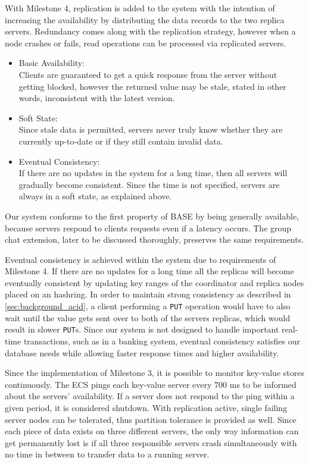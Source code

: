 With Milestone 4, replication is added to the system with the intention of increasing the availability by distributing the data records to the two replica servers. Redundancy comes along with the replication strategy, however when a node crashes or fails, read operations can be processed via replicated servers.

\begin{itemize}
  \item Basic Availability:\\
 Clients are guaranteed to get a quick response from the server without getting blocked, however the returned value may be stale, stated in other words, inconsistent with the latest version.
  \item Soft State:\\
Since stale data is permitted, servers never truly know whether they are currently up-to-date or if they still contain invalid data.
  \item Eventual Consistency:\\
If there are no updates in the system for a long time, then all servers will gradually become consistent. Since the time is not specified, servers are always in a soft state, as explained above.
\end{itemize}

Our system conforms to the first property of BASE by being generally available, because servers respond to clients requests even if a latency occurs. The group chat extension, later to be discussed thoroughly, preserves the same requirements.

Eventual consistency is achieved within the system due to requirements of Milestone 4. If there are no updates for a long time all the replicas will become eventually consistent by updating key ranges of the coordinator and replica nodes placed on an hashring. In order to maintain strong consistency as described in \ref{sec:background_acid}, a client performing a \texttt{PUT} operation would have to also wait until the value gets sent over to both of the servers replicas, which would result in slower \texttt{PUT}s. Since our system is not designed to handle important real-time transactions, such as in a banking system, eventual consistency satisfies our database needs while allowing faster response times and higher availability. 

Since the implementation of Milestone 3, it is possible to monitor key-value stores continuously. The ECS pings each key-value server every 700 ms to be informed about the servers’ availability. If a server does not respond to the ping within a given period, it is considered shutdown. With replication active, single failing server nodes can be tolerated, thus partition tolerance is provided as well. Since each piece of data exists on three different servers, the only way information can get permanently lost is if all three responsible servers crash simultaneously with no time in between to transfer data to a running server.

